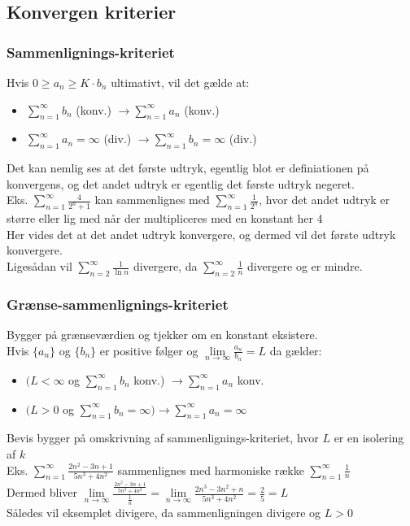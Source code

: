 \documentclass[12pt, a4paper]{article}
\begin{document}
	\subsection{Konvergen kriterier}
		\subsubsection{Sammenlignings-kriteriet}
			Hvis $0\geq a_n \geq K\cdot b_n$ ultimativt, vil det gælde at:
			\begin{itemize}
				\item $\sum\limits_{n=1}^{\infty}b_n$ (konv.) $\rightarrow \sum\limits_{n=1}^{\infty}a_n$ (konv.)\\
				\item $\sum\limits_{n=1}^{\infty}a_n = \infty$ (div.) $\rightarrow \sum\limits_{n=1}^{\infty}b_n=\infty$ (div.)
			\end{itemize}
			Det kan nemlig ses at det første udtryk, egentlig blot er definiationen på konvergens, og det andet udtryk er egentlig det første udtryk negeret.\\
			Eks. $\sum\limits_{n=1}^{\infty}\frac{4}{2^n+1}$ kan sammenlignes med $\sum\limits_{n=1}^{\infty}\frac{1}{2^n}$, hvor det andet udtryk er større eller lig med når der multipliceres med en konstant her 4\\
			Her vides det at det andet udtryk konvergere, og dermed vil det første udtryk konvergere.\\
			Ligesådan vil $\sum\limits_{n=2}^{\infty}\frac{1}{\ln n}$ divergere, da $\sum\limits_{n=2}^{\infty}\frac{1}{n}$ divergere og er mindre.
		\subsubsection{Grænse-sammenlignings-kriteriet}
			Bygger på grænseværdien og tjekker om en konstant eksistere.\\
			Hvis $\{a_n\}$ og $\{b_n\}$ er positive følger og $\lim\limits_{n\rightarrow \infty}\frac{a_n}{b_n}=L$ da gælder:	
			\begin{itemize}
				\item $(L<\infty$ og $\sum\limits_{n=1}^{\infty}b_n$ konv.) $\rightarrow \sum\limits_{n=1}^{\infty}a_n$ konv.
				\item $(L > 0 $ og $\sum\limits_{n=1}^{\infty}b_n=\infty) \rightarrow \sum\limits_{n=1}^{\infty}a_n=\infty$
			\end{itemize}
			Bevis bygger på omskrivning af sammenlignings-kriteriet, hvor $L$ er en isolering af $k$\\
			Eks. $\sum\limits_{n=1}^{\infty}\frac{2n^2-3n+1}{5n^3+4n^2}$ sammenlignes med harmoniske række $\sum\limits_{n=1}^{\infty}\frac{1}{n}$\\
			Dermed bliver $\lim\limits_{n\rightarrow \infty}\frac{\frac{2n^2-3n+1}{5n^3+4n^2}}{\frac{1}{n}}=\lim\limits_{n\rightarrow \infty}\frac{2n^3-3n^2+n}{5n^3+4n^2}=\frac{2}{5}=L$\\
			Således vil eksemplet divigere, da sammenligningen divigere og $L>0$
\end{document}
